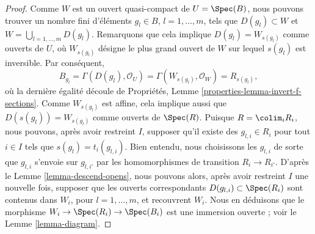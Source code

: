 \begin{proof}
\medskip\noindent
Comme $W$ est un ouvert quasi-compact de $U = \Spec(B)$, nous pouvons trouver
un nombre fini d'éléments $g_l \in B$, $l = 1, \ldots, m$, tels que
$D(g_l) \subset W$ et $W = \bigcup_{l = 1, \ldots, m} D(g_l)$. Remarquons
que cela implique $D(g_l) = W_{s(g_l)}$ comme ouverts de $U$, où
$W_{s(g_l)}$ désigne le plus grand ouvert de $W$ sur lequel $s(g_l)$ est
inversible. Par conséquent,
$$
B_{g_l} =
\Gamma(D(g_l), \mathcal{O}_U) =
\Gamma(W_{s(g_l)}, \mathcal{O}_W) = R_{s(g_l)},
$$
où la dernière égalité découle de Propriétés,
Lemme \ref{properties-lemma-invert-f-sections}. Comme $W_{s(g_l)}$ est
affine, cela implique aussi que $D(s(g_l)) = W_{s(g_l)}$ comme ouverts de
$\Spec(R)$. Puisque $R = \colim_i R_i$, nous pouvons, après avoir restreint
$I$, supposer qu'il existe des $g_{l, i} \in R_i$ pour tout $i \in I$ tels
que $s(g_l) = t_i(g_{l, i})$. Bien entendu, nous choisissons les $g_{l, i}$
de sorte que $g_{l, i}$ s'envoie sur $g_{l, i'}$ par les homomorphismes de
transition $R_i \to R_{i'}$. D'après le Lemme \ref{lemma-descend-opens}, nous
pouvons alors, après avoir restreint $I$ une nouvelle fois, supposer que les
ouverts correspondants $D(g_{l, i}) \subset \Spec(R_i)$ sont contenus dans
$W_i$, pour $l = 1, \ldots, m$, et recouvrent $W_i$. Nous en déduisons que
le morphisme $W_i \to \Spec(R_i) \to \Spec(B_i)$ est une immersion ouverte ;
voir le Lemme \ref{lemma-diagram}.


\end{proof}

